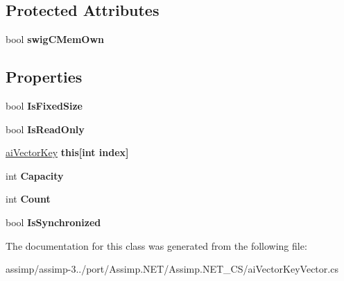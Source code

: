 \subsection*{Protected Attributes}
\begin{DoxyCompactItemize}
\item 
\hypertarget{classai_vector_key_vector_afbc1316210c38248ba6c6e3b16b02ae1}{bool {\bfseries swig\+C\+Mem\+Own}}\label{classai_vector_key_vector_afbc1316210c38248ba6c6e3b16b02ae1}

\end{DoxyCompactItemize}
\subsection*{Properties}
\begin{DoxyCompactItemize}
\item 
\hypertarget{classai_vector_key_vector_ac58ebb105127b728e81a9ad7b2aeecc2}{bool {\bfseries Is\+Fixed\+Size}}\label{classai_vector_key_vector_ac58ebb105127b728e81a9ad7b2aeecc2}

\item 
\hypertarget{classai_vector_key_vector_aaa091bd02e1607e7282da1e8756d42ca}{bool {\bfseries Is\+Read\+Only}}\label{classai_vector_key_vector_aaa091bd02e1607e7282da1e8756d42ca}

\item 
\hypertarget{classai_vector_key_vector_a512568aec8a3aabbbae4d5b5e24df885}{\hyperlink{structai_vector_key}{ai\+Vector\+Key} {\bfseries this\mbox{[}int index\mbox{]}}}\label{classai_vector_key_vector_a512568aec8a3aabbbae4d5b5e24df885}

\item 
\hypertarget{classai_vector_key_vector_aeba0723edd3fccb550b7a130588a19ff}{int {\bfseries Capacity}}\label{classai_vector_key_vector_aeba0723edd3fccb550b7a130588a19ff}

\item 
\hypertarget{classai_vector_key_vector_a4a8961ff6894fc48cd5cb24880740b4b}{int {\bfseries Count}}\label{classai_vector_key_vector_a4a8961ff6894fc48cd5cb24880740b4b}

\item 
\hypertarget{classai_vector_key_vector_a3393057dab6caf07e574d908c66145a3}{bool {\bfseries Is\+Synchronized}}\label{classai_vector_key_vector_a3393057dab6caf07e574d908c66145a3}

\end{DoxyCompactItemize}


The documentation for this class was generated from the following file\+:\begin{DoxyCompactItemize}
\item 
assimp/assimp-\/3../port/\+Assimp.\+N\+E\+T/\+Assimp.\+N\+E\+T\+\_\+\+C\+S/ai\+Vector\+Key\+Vector.\+cs\end{DoxyCompactItemize}
